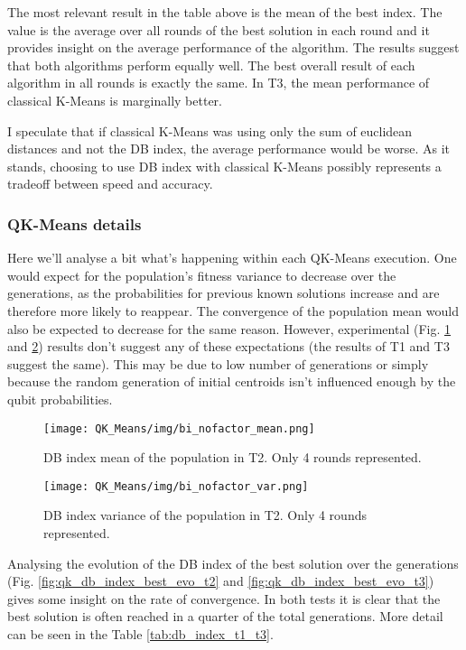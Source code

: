 The most relevant result in the table above is the mean of the best index. The value is the average over all rounds of the best solution in each round and it provides insight on the average performance of the algorithm. The results suggest that both algorithms perform equally well. The best overall result of each algorithm in all rounds is exactly the same. In T3, the mean performance of classical K-Means is marginally better.

I speculate that if classical K-Means was using only the sum of euclidean distances and not the DB index, the average performance would be worse. As it stands, choosing to use DB index with classical K-Means possibly represents a tradeoff between speed and accuracy.

\subsubsection{QK-Means details}

Here we’ll analyse a bit what’s happening within each QK-Means execution. One would expect for the population’s fitness variance to decrease over the generations, as the probabilities for previous known solutions increase and are therefore more likely to reappear. The convergence of the population mean would also be expected to decrease for the same reason. However, experimental (Fig. \ref{fig:db_index_mean_t2} and \ref{fig:db_index_var_t2}) results don’t suggest any of these expectations (the results of T1 and T3 suggest the same). This may be due to low number of generations or simply because the random generation of initial centroids isn’t influenced enough by the qubit probabilities.


\begin{figure}[hbtp]
\centering
\texttt{[image: QK\_Means/img/bi\_nofactor\_mean.png]}
\caption{DB index mean of the population in T2. Only 4 rounds represented.}
\label{fig:db_index_mean_t2}
\end{figure}

\begin{figure}[hbtp]
\centering
\texttt{[image: QK\_Means/img/bi\_nofactor\_var.png]}
\caption{DB index variance of the population in T2. Only 4 rounds represented.}
\label{fig:db_index_var_t2}
\end{figure}


Analysing the evolution of the DB index of the best solution over the generations (Fig. \ref{fig:qk_db_index_best_evo_t2} and \ref{fig:qk_db_index_best_evo_t3}) gives some insight on the rate of convergence. In both tests it is clear that the best solution is often reached in a quarter of the total generations. More detail can be seen in the Table \ref{tab:db_index_t1_t3}.

